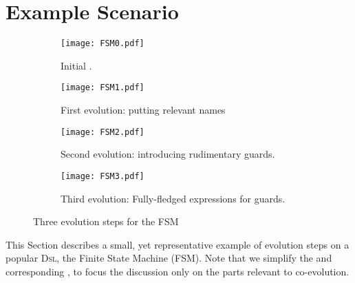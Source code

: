 \section{Example Scenario}
\label{sec:Example}

\begin{figure*}
    \centering
    \begin{subfigure}[b]{0.45\textwidth}
			\centering
      \texttt{[image: FSM0.pdf]}
      \caption{Initial \metamodel.}
      \label{fig:FSM:Init}
    \end{subfigure}
    \hfill
    \begin{subfigure}[b]{0.45\textwidth}
			\centering
      \texttt{[image: FSM1.pdf]}
      \caption{First evolution: putting relevant names}
      \label{fig:FSM:Relevant}
    \end{subfigure}
    \hfill
    \begin{subfigure}[b]{0.45\textwidth}
			\centering
      \texttt{[image: FSM2.pdf]}
      \caption{Second evolution: introducing rudimentary guards.}
      \label{fig:FSM:Guard}
    \end{subfigure}
    \hfill 
		\begin{subfigure}[b]{0.45\textwidth}
			\centering
      \texttt{[image: FSM3.pdf]}
      \caption{Third evolution: Fully-fledged expressions for \textsf{guard}s.}
      \label{fig:FSM:Expression}
    \end{subfigure}
    \caption{Three evolution steps for the \textsf{FSM} \metamodel}
    \label{fig:FSM}
\end{figure*}



This Section describes a small, yet representative example of \metamodel
evolution steps on a popular \textsc{Dsl}, the Finite State Machine (\textsf{FSM}).
Note that we simplify the \metamodels and corresponding \viewtypes, to focus 
the discussion only on the parts relevant to co-evolution. 

